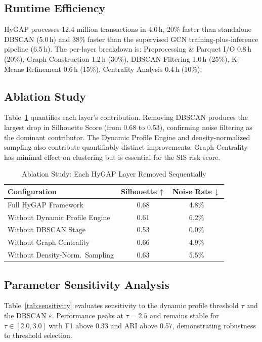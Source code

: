 \documentclass[conference]{IEEEtran}
\begin{document}
\subsection{Runtime Efficiency}
HyGAP processes 12.4 million transactions in 4.0\,h, 20\% faster
than standalone DBSCAN (5.0\,h) and 38\% faster than the
supervised GCN training-plus-inference pipeline (6.5\,h).
The per-layer breakdown is: Preprocessing \& Parquet I/O 0.8\,h
(20\%), Graph Construction 1.2\,h (30\%), DBSCAN Filtering
1.0\,h (25\%), K-Means Refinement 0.6\,h (15\%), Centrality
Analysis 0.4\,h (10\%).

\subsection{Ablation Study}
Table~\ref{tab:ablation} quantifies each layer's contribution.
Removing DBSCAN produces the largest drop in Silhouette Score
(from 0.68 to 0.53), confirming noise filtering as the dominant
contributor. The Dynamic Profile Engine and density-normalized
sampling also contribute quantifiably distinct improvements.
Graph Centrality has minimal effect on clustering but is
essential for the SIS risk score.

\begin{table}[t]
\caption{Ablation Study: Each HyGAP Layer Removed Sequentially}
\label{tab:ablation}
\centering
\begin{tabular}{@{}lcc@{}}
\toprule
\textbf{Configuration} & \textbf{Silhouette\,$\uparrow$} &
\textbf{Noise Rate\,$\downarrow$} \\
\midrule
Full HyGAP Framework               & 0.68 & 4.8\% \\
Without Dynamic Profile Engine     & 0.61 & 6.2\% \\
Without DBSCAN Stage               & 0.53 & 0.0\% \\
Without Graph Centrality           & 0.66 & 4.9\% \\
Without Density-Norm.\ Sampling    & 0.63 & 5.5\% \\
\bottomrule
\end{tabular}
\end{table}

\subsection{Parameter Sensitivity Analysis}
Table~\ref{tab:sensitivity} evaluates sensitivity to the
dynamic profile threshold $\tau$ and the DBSCAN $\varepsilon$.
Performance peaks at $\tau\!=\!2.5$ and remains stable for
$\tau \in [2.0, 3.0]$ with F1 above 0.33 and ARI above 0.57,
demonstrating robustness to threshold selection.
\end{document}
